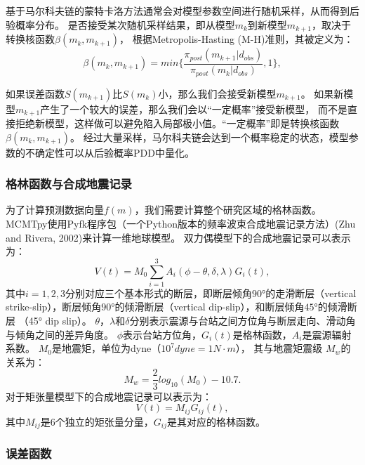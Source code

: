 基于马尔科夫链的蒙特卡洛方法通常会对模型参数空间进行随机采样，从而得到后验概率分布。
是否接受某次随机采样结果，即从模型$m_k$到新模型$m_{k+1}$，取决于转换核函数$\beta(m_k,m_{k+1})$，
根据Metropolis-Hasting (M-H)准则\citep{Metropolis1953}，其被定义为：
\begin{equation}
    \beta(m_k,m_{k+1}) = min \biggl\{ \frac{\pi_{post}(m_{k+1}|d_{obs})} {\pi_{post}(m_{k}|d_{obs})}, 1   \biggr\},
\end{equation}

如果误差函数$S(m_{k+1})$比$S(m_{k})$小，那么我们会接受新模型$m_{k+1}$。
如果新模型$m_{k+1}$产生了一个较大的误差，那么我们会以“一定概率”接受新模型，
而不是直接拒绝新模型，这样做可以避免陷入局部极小值。“一定概率”即是转换核函数$\beta(m_k,m_{k+1})$。
经过大量采样，马尔科夫链会达到一个概率稳定的状态，模型参数的不确定性可以从后验概率PDD中量化。


\subsubsection{格林函数与合成地震记录}

为了计算预测数据向量$f(m)$，我们需要计算整个研究区域的格林函数。
MCMTpy使用Pyfk程序包（一个Python版本的频率波束合成地震记录方法）(Zhu and Rivera, 2002)来计算一维地球模型。
双力偶模型下的合成地震记录可以表示为：
\begin{equation}
    V(t)=M_0 \sum_{i=1}^3 A_i(\phi - \theta, \delta, \lambda ) G_i(t),
\end{equation}
其中$i=1,2,3$分别对应三个基本形式的断层，即断层倾角$90°$的走滑断层（vertical strike-slip），断层倾角$90°$的倾滑断层（vertical dip-slip），和断层倾角$45°$的倾滑断层 （45° dip slip）。
$\theta$，$\lambda$和$\delta$分别表示震源与台站之间方位角与断层走向、滑动角与倾角之间的差异角度。
$\phi$表示台站方位角，$G_i(t)$是格林函数，$A_i$是震源辐射系数。
$M_0$是地震矩，单位为dyne（$10^7 dyne = 1N \cdot m$），
其与地震矩震级 $M_w$\citep{Kanamori1993}的关系为：
\begin{equation}
    M_w = \frac{2}{3} log_{10}(M_0) - 10.7.
\end{equation}
对于矩张量模型下的合成地震记录可以表示为：
\begin{equation}
    V(t) = M_{ij} G_{ij}(t),
\end{equation}
其中$M_{ij}$是6个独立的矩张量分量，$G_{ij}$是其对应的格林函数。


\subsubsection{误差函数}


